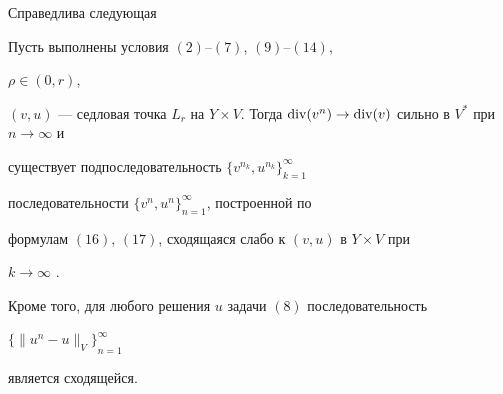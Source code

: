  


Справедлива следующая


 


\begin{thm} Пусть выполнены условия $(2)$--$(7)$, $(9)$--$(14)$,


$\rho \in (0,r)$, 


$(v,u)$ --- седловая точка $L_{r}$ на $Y \times V$. Тогда $\Div (v^{n}) 


\to \Div (v)$ сильно в $V^{*}$ при $n \to \infty $ и 


существует подпоследовательность $\{ v^{n_{k}}, u^{n_{k}} \}_{k = 1}^{\infty}$


последовательности $\{ v^{n},u^{n} \}_{n = 1}^{\infty} $, построенной по 


формулам $(16)$, $(17)$, сходящаяся слабо к $(v,u)$ в $Y \times V$ при 


$k \to \infty$ .


 


Кроме того, для любого решения $u$ задачи $(8)$ последовательность 


${ \{\|u^{n} - u\|_{V} \} }_{n = 1}^{\infty} $ 


является сходящейся.


\end{thm}


 


